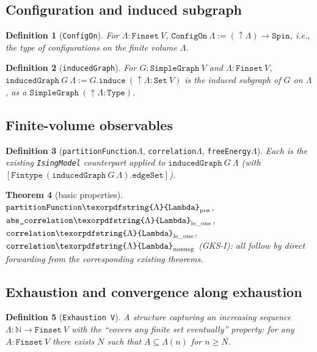 \documentclass[a4paper,11pt]{article}
\newtheorem{theorem}{Theorem}
\newtheorem{definition}[theorem]{Definition}
\newcommand{\LeanLambda}{\texorpdfstring{\ensuremath{\Lambda}}{Lambda}}
\begin{document}
\subsection{Configuration and induced subgraph}

\begin{definition}[\texttt{ConfigOn}]
For $\Lambda : \texttt{Finset}~V$, $\texttt{ConfigOn}~\Lambda :=
(\uparrow\!\Lambda) \to \texttt{Spin}$, i.e., the type of
configurations on the finite volume $\Lambda$.
\end{definition}

\begin{definition}[\texttt{inducedGraph}]
For $G : \texttt{SimpleGraph}~V$ and $\Lambda : \texttt{Finset}~V$,
$\texttt{inducedGraph}~G~\Lambda := G.\texttt{induce}~(\uparrow\!\Lambda
: \texttt{Set}~V)$ is the induced subgraph of $G$ on $\Lambda$, as a
$\texttt{SimpleGraph}~(\uparrow\!\Lambda : \texttt{Type})$.
\end{definition}

\subsection{Finite-volume observables}

\begin{definition}[\texttt{partitionFunction\LeanLambda}, \texttt{correlation\LeanLambda},
  \texttt{freeEnergy\LeanLambda}]
Each is the existing \texttt{IsingModel} counterpart applied to
$\texttt{inducedGraph}~G~\Lambda$ (with $[\texttt{Fintype}~(\texttt{inducedGraph}~G~\Lambda).\texttt{edgeSet}]$).
\end{definition}

\begin{theorem}[basic properties]
$\texttt{partitionFunction\LeanLambda}_{\mathrm{pos}}$,
$\texttt{abs\_correlation\LeanLambda}_{\mathrm{le\_one}}$,
$\texttt{correlation\LeanLambda}_{\mathrm{le\_one}}$,
$\texttt{correlation\LeanLambda}_{\mathrm{nonneg}}$ (GKS-I): all follow by
direct forwarding from the corresponding existing theorems.
\end{theorem}

\subsection{Exhaustion and convergence along exhaustion}

\begin{definition}[\texttt{Exhaustion V}]
A structure capturing an increasing sequence
$\Lambda : \mathbb{N} \to \texttt{Finset}~V$ with the ``covers any
finite set eventually'' property: for any $A : \texttt{Finset}~V$
there exists $N$ such that $A \subseteq \Lambda(n)$ for $n \ge N$.
\end{definition}
\end{document}
